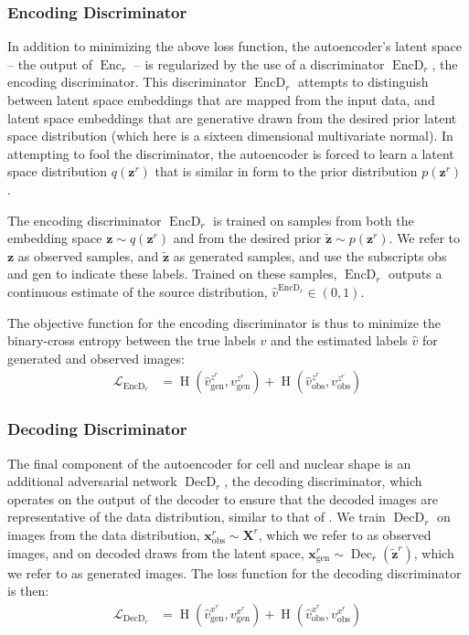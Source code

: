 \documentclass[accepted]{article}
\DeclareMathOperator{\EncD}{EncD}
\DeclareMathOperator{\DecD}{DecD}
\DeclareMathOperator{\Enc}{Enc}
\DeclareMathOperator{\Dec}{Dec}
\DeclareMathOperator{\bce}{H}
\begin{document}
\subsubsection{Encoding Discriminator}

In addition to minimizing the above loss function, the autoencoder's latent space -- the output of $\Enc_r$ -- is regularized by the use of a discriminator $\EncD_r$, the encoding discriminator.
This discriminator $\EncD_r$ attempts to distinguish between latent space embeddings that are mapped from the input data, and latent space embeddings that are generative drawn from the desired prior latent space distribution (which here is a sixteen dimensional multivariate normal).
In attempting to fool the discriminator, the autoencoder is forced to learn a latent space distribution $q(\bm{z}^r)$ that is similar in form to the prior distribution $p(\bm{z}^r)$ \cite{Makhzani:2015tm}.

The encoding discriminator $\EncD_r$ is trained on samples from both the embedding space $\bm{z} \sim q(\bm{z}^r)$ and from the desired prior $\tilde{\bm{z}} \sim p(\bm{z}^r)$.
We refer to $\bm{z}$ as observed samples, and $\tilde{\bm{z}}$ as generated samples, and use the subscripts obs and gen to indicate these labels.
Trained on these samples, $\EncD_r$ outputs a continuous estimate of the source distribution, $\hat{v}^{\EncD_r} \in (0,1)$.

The objective function for the encoding discriminator is thus to minimize the binary-cross entropy between the true labels $v$ and the estimated labels $\hat{v}$ for generated and observed images:
%
\begin{align} \label{eqn:loss_EncDr}
    \mathcal{L}_{\EncD_r} &=    \bce(\hat{v}^{z^r}_{\text{gen}}, v^{z^r}_{\text{gen}}) +
                                \bce(\hat{v}^{z^r}_{\text{obs}}, v^{z^r}_{\text{obs}})
\end{align}
%

\subsubsection{Decoding Discriminator}

The final component of the autoencoder for cell and nuclear shape is an additional adversarial network $\DecD_r$, the decoding discriminator, which operates on the output of the decoder to ensure that the decoded images are representative of the data distribution, similar to that of \cite{Larsen:2015vi}.
We train $\DecD_r$ on images from the data distribution, $\bm{x}^r_\text{obs} \sim \bm{X}^r$, which we refer to as observed images, and on decoded draws from the latent space, $\bm{x}^r_\text{gen} \sim \Dec_r(\tilde{\bm{z}}^r)$, which we refer to as generated images.
The loss function for the decoding discriminator is then:
%
\begin{align}
    \mathcal{L}_{\DecD_r} &=    \bce(\hat{v}^{x^r}_{\text{gen}}, v^{x^r}_{\text{gen}}) +
                                \bce(\hat{v}^{x^r}_{\text{obs}}, v^{x^r}_{\text{obs}})
\end{align}
\end{document}
